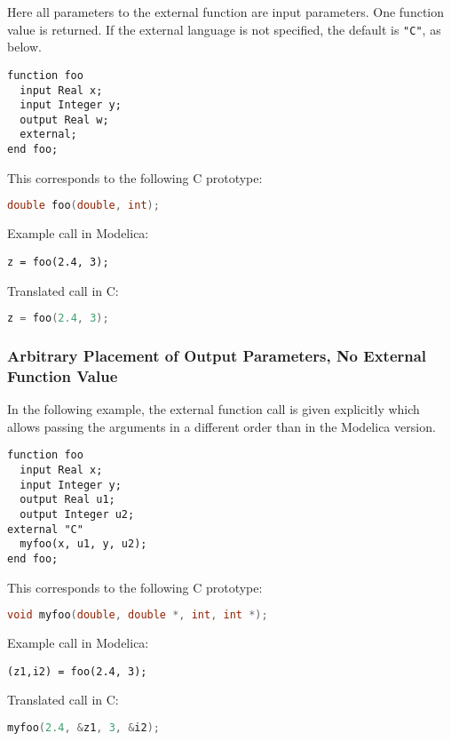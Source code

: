 \begin{example}
Here all parameters to the external function are input
parameters. One function value is returned. If the external language is
not specified, the default is \lstinline!"C"!, as below.
\begin{lstlisting}[language=modelica]
function foo
  input Real x;
  input Integer y;
  output Real w;
  external;
end foo;
\end{lstlisting}
This corresponds to the following C prototype:
\begin{lstlisting}[language=C]
double foo(double, int);
\end{lstlisting}

Example call in Modelica:
\begin{lstlisting}[language=modelica]
z = foo(2.4, 3);
\end{lstlisting}
Translated call in C:
\begin{lstlisting}[language=C]
z = foo(2.4, 3);
\end{lstlisting}
\end{example}

\subsubsection{Arbitrary Placement of Output Parameters, No External Function Value}\label{arbitrary-placement-of-output-parameters-no-external-function-value}

\begin{example}
In the following example, the external function call is given
explicitly which allows passing the arguments in a different order than
in the Modelica version.
\begin{lstlisting}[language=modelica]
function foo
  input Real x;
  input Integer y;
  output Real u1;
  output Integer u2;
external "C"
  myfoo(x, u1, y, u2);
end foo;
\end{lstlisting}
This corresponds to the following C prototype:
\begin{lstlisting}[language=C]
void myfoo(double, double *, int, int *);
\end{lstlisting}
Example call in Modelica:
\begin{lstlisting}[language=modelica]
(z1,i2) = foo(2.4, 3);
\end{lstlisting}
Translated call in C:
\begin{lstlisting}[language=C]
myfoo(2.4, &z1, 3, &i2);
\end{lstlisting}
\end{example}

